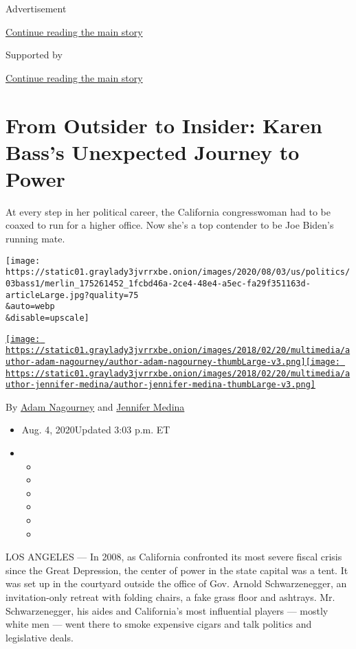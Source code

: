 Advertisement

\protect\hyperlink{after-top}{Continue reading the main story}

Supported by

\protect\hyperlink{after-sponsor}{Continue reading the main story}

\hypertarget{from-outsider-to-insider-karen-basss-unexpected-journey-to-power}{%
\section{From Outsider to Insider: Karen Bass's Unexpected Journey to
Power}\label{from-outsider-to-insider-karen-basss-unexpected-journey-to-power}}

At every step in her political career, the California congresswoman had
to be coaxed to run for a higher office. Now she's a top contender to be
Joe Biden's running mate.

\texttt{[image: https://static01.graylady3jvrrxbe.onion/images/2020/08/03/us/politics/03bass1/merlin\_175261452\_1fcbd46a-2ce4-48e4-a5ec-fa29f351163d-articleLarge.jpg?quality=75\\\&auto=webp\\\&disable=upscale]}

\href{https://www.nytimes3xbfgragh.onion/by/adam-nagourney}{\texttt{[image: https://static01.graylady3jvrrxbe.onion/images/2018/02/20/multimedia/author-adam-nagourney/author-adam-nagourney-thumbLarge-v3.png]}}\href{https://www.nytimes3xbfgragh.onion/by/jennifer-medina}{\texttt{[image: https://static01.graylady3jvrrxbe.onion/images/2018/02/20/multimedia/author-jennifer-medina/author-jennifer-medina-thumbLarge-v3.png]}}

By \href{https://www.nytimes3xbfgragh.onion/by/adam-nagourney}{Adam
Nagourney} and
\href{https://www.nytimes3xbfgragh.onion/by/jennifer-medina}{Jennifer
Medina}

\begin{itemize}
\item
  Aug. 4, 2020Updated 3:03 p.m. ET
\item
  \begin{itemize}
  \item
  \item
  \item
  \item
  \item
  \item
  \end{itemize}
\end{itemize}

LOS ANGELES --- In 2008, as California confronted its most severe fiscal
crisis since the Great Depression, the center of power in the state
capital was a tent. It was set up in the courtyard outside the office of
Gov. Arnold Schwarzenegger, an invitation-only retreat with folding
chairs, a fake grass floor and ashtrays. Mr. Schwarzenegger, his aides
and California's most influential players --- mostly white men --- went
there to smoke expensive cigars and talk politics and legislative deals.

